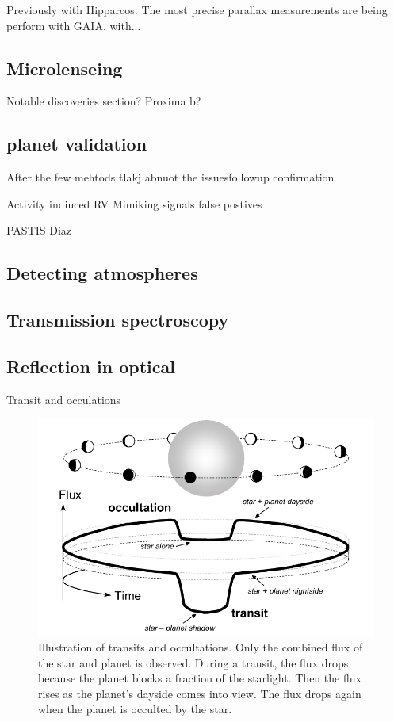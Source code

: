 Previously with Hipparcos.
The most precise parallax measurements are being perform with GAIA, with...


\subsection{Microlenseing}


Notable discoveries section? Proxima b?  


\subsection{planet validation}
After the few mehtods tlakj abnuot the issuesfollowup confirmation

Activity indiuced RV
Mimiking signals false postives

PASTIS Diaz



\subsection{Detecting atmospheres}

\subsection{Transmission spectroscopy}

\subsection{Reflection in optical}

Transit and occulations \citet{winn_transits_2010}


\begin{figure}
    \centering
    \includegraphics[width=0.6\linewidth]{./figures/introduction/circular_diagram.png}
    \caption{Illustration of transits and occultations. Only the combined flux of the star and planet is observed. During a transit, the flux
        drops because the planet blocks a fraction of the starlight. Then the flux rises as the planet’s dayside comes into view. The flux drops
        again when the planet is occulted by the star. \citet{winn_transits_2010}}
    \label{fig:transits_and_occultations}
\end{figure}

